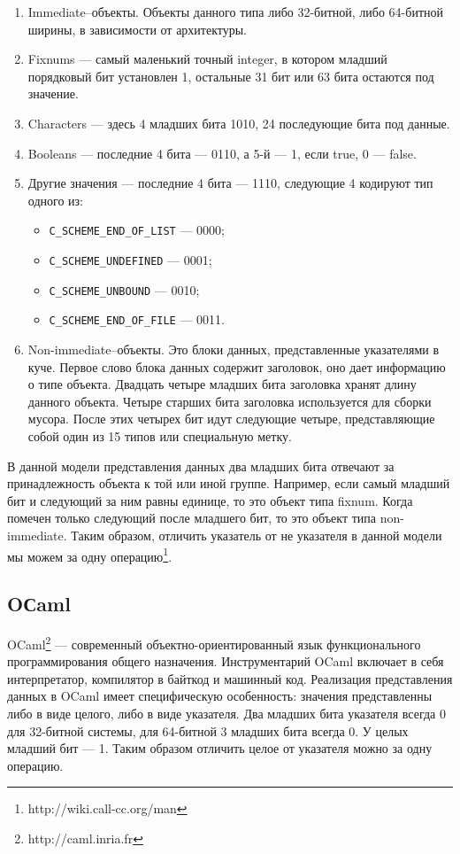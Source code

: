 \begin{enumerate}
\item Immediate--объекты.
Объекты данного типа либо 32-битной, либо 64-битной ширины, в зависимости от архитектуры.
\item Fixnums --- самый маленький точный integer, в котором младший порядковый бит 
установлен 1, остальные 31 бит или 63 бита остаются под значение.
\item Characters --- здесь 4 младших бита 1010, 24 последующие бита под данные.
\item Booleans --- последние 4 бита --- 0110, а 5-й --- 1, если true, 0 --- false.
\item Другие значения --- последние 4 бита --- 1110, следующие 4 кодируют тип одного из:

\begin{itemize}
\item \lstinline{C_SCHEME_END_OF_LIST} --- 0000;
\item \lstinline{C_SCHEME_UNDEFINED} --- 0001;
\item \lstinline{C_SCHEME_UNBOUND} --- 0010;
\item \lstinline{C_SCHEME_END_OF_FILE} --- 0011.
\end{itemize}

\item Non-immediate--объекты.
Это блоки данных, представленные указателями в куче.
Первое слово блока данных содержит заголовок, оно дает информацию о типе объекта. 
Двадцать четыре младших бита заголовка хранят длину данного объекта.
Четыре старших бита заголовка используется для сборки 
мусора.
После этих четырех бит идут следующие четыре, представляющие собой один из 15 типов или специальную метку.
\end{enumerate}

В данной модели представления данных два младших бита отвечают за принадлежность объекта к той или иной 
группе. Например, если самый младший бит и следующий за ним равны единице, то это объект типа fixnum.
Когда помечен только следующий после младшего бит, то это объект типа non-immediate.
Таким образом, отличить указатель от не указателя в данной модели мы можем за одну 
операцию\footnote{http://wiki.call-cc.org/man}.

\subsection {OСaml}

OCaml\footnote{http://caml.inria.fr} --- современный объектно-ориентированный язык функционального программирования общего назначения. 
Инструментарий OCaml включает в себя интерпретатор, компилятор в байткод и машинный код.
Реализация представления данных в OCaml имеет специфическую особенность:
значения представленны либо в виде целого, либо в виде указателя.
Два младших бита указателя всегда 0 для 32-битной системы, для 64-битной 3 младших бита всегда 0. У целых младший бит — 1. 
Таким образом отличить целое от указателя можно за одну операцию.

